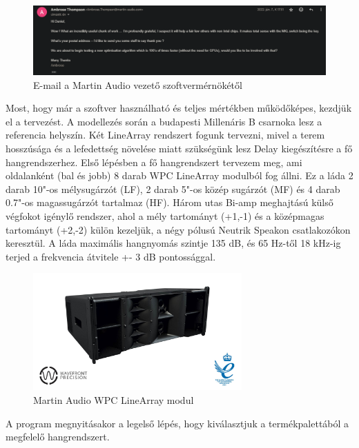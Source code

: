 \begin{figure}[H]
	\centering
	\includegraphics[width=\textwidth, keepaspectratio]{figures/ambrose_email.png}
	\caption{E-mail a Martin Audio vezető szoftvermérnökétől}
	\label{fig:ambrose_email}
\end{figure}
Most, hogy már a szoftver használható és teljes mértékben működőképes, kezdjük el a tervezést.
A modellezés során a budapesti Millenáris B csarnoka lesz a referencia helyszín. Két LineArray rendszert fogunk
tervezni, mivel a terem hosszúsága és a lefedettség növelése miatt szükségünk lesz Delay kiegészítésre a fő hangrendszerhez.
Első lépésben a fő hangrendszert tervezem meg, ami oldalanként (bal és jobb) 8 darab WPC LineArray modulból fog állni.
Ez a láda 2 darab 10"-os mélysugárzót (LF), 2 darab 5"-os közép sugárzót (MF) és 4 darab 0.7"-os magassugárzót tartalmaz (HF).
Három utas Bi-amp meghajtású külső végfokot igénylő rendszer, ahol a mély tartományt (+1,-1) és a középmagas tartományt (+2,-2) külön kezeljük,
a négy pólusú Neutrik Speakon csatlakozókon keresztül.
A láda maximális hangnyomás szintje 135 dB, és 65 Hz-től 18 kHz-ig terjed a frekvencia átvitele +- 3 dB pontossággal.~\cite{WPCUSERGUIDE}
\begin{figure}[H]
	\centering
	\includegraphics[width=80mm, keepaspectratio]{figures/wpc_front_view.jpg}
	\caption{Martin Audio WPC LineArray modul}\label{fig:wpc}
\end{figure}
A program megnyitásakor a legelső lépés, hogy kiválasztjuk a termékpalettából a megfelelő hangrendszert.
